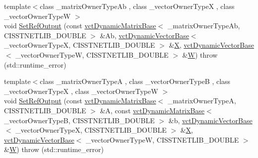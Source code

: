 \begin{DoxyCompactItemize}
\end{DoxyCompactItemize}

{\bf }\par
\begin{DoxyCompactItemize}
\item 
{\footnotesize template$<$class \+\_\+matrix\+Owner\+Type\+Ab , class \+\_\+vector\+Owner\+Type\+X , class \+\_\+vector\+Owner\+Type\+W $>$ }\\void \hyperlink{classnmr_n_n_l_s_dynamic_data_a8b4529a38e1b16bbe5f805e11a2f5560}{Set\+Ref\+Output} (const \hyperlink{classvct_dynamic_matrix_base}{vct\+Dynamic\+Matrix\+Base}$<$ \+\_\+matrix\+Owner\+Type\+Ab, C\+I\+S\+S\+T\+N\+E\+T\+L\+I\+B\+\_\+\+D\+O\+U\+B\+L\+E $>$ \&Ab, \hyperlink{classvct_dynamic_vector_base}{vct\+Dynamic\+Vector\+Base}$<$ \+\_\+vector\+Owner\+Type\+X, C\+I\+S\+S\+T\+N\+E\+T\+L\+I\+B\+\_\+\+D\+O\+U\+B\+L\+E $>$ \&\hyperlink{classnmr_n_n_l_s_dynamic_data_a2c67d4c5f9eff20ae015e60f85718f02}{X}, \hyperlink{classvct_dynamic_vector_base}{vct\+Dynamic\+Vector\+Base}$<$ \+\_\+vector\+Owner\+Type\+W, C\+I\+S\+S\+T\+N\+E\+T\+L\+I\+B\+\_\+\+D\+O\+U\+B\+L\+E $>$ \&\hyperlink{classnmr_n_n_l_s_dynamic_data_ae3204dc027313115b092088253dc4bb0}{W})  throw (std\+::runtime\+\_\+error)
\item 
{\footnotesize template$<$class \+\_\+matrix\+Owner\+Type\+A , class \+\_\+vector\+Owner\+Type\+B , class \+\_\+vector\+Owner\+Type\+X , class \+\_\+vector\+Owner\+Type\+W $>$ }\\void \hyperlink{classnmr_n_n_l_s_dynamic_data_aa959977e6c2fc5125cdbd0947f918630}{Set\+Ref\+Output} (const \hyperlink{classvct_dynamic_matrix_base}{vct\+Dynamic\+Matrix\+Base}$<$ \+\_\+matrix\+Owner\+Type\+A, C\+I\+S\+S\+T\+N\+E\+T\+L\+I\+B\+\_\+\+D\+O\+U\+B\+L\+E $>$ \&A, const \hyperlink{classvct_dynamic_matrix_base}{vct\+Dynamic\+Matrix\+Base}$<$ \+\_\+vector\+Owner\+Type\+B, C\+I\+S\+S\+T\+N\+E\+T\+L\+I\+B\+\_\+\+D\+O\+U\+B\+L\+E $>$ \&b, \hyperlink{classvct_dynamic_vector_base}{vct\+Dynamic\+Vector\+Base}$<$ \+\_\+vector\+Owner\+Type\+X, C\+I\+S\+S\+T\+N\+E\+T\+L\+I\+B\+\_\+\+D\+O\+U\+B\+L\+E $>$ \&\hyperlink{classnmr_n_n_l_s_dynamic_data_a2c67d4c5f9eff20ae015e60f85718f02}{X}, \hyperlink{classvct_dynamic_vector_base}{vct\+Dynamic\+Vector\+Base}$<$ \+\_\+vector\+Owner\+Type\+W, C\+I\+S\+S\+T\+N\+E\+T\+L\+I\+B\+\_\+\+D\+O\+U\+B\+L\+E $>$ \&\hyperlink{classnmr_n_n_l_s_dynamic_data_ae3204dc027313115b092088253dc4bb0}{W})  throw (std\+::runtime\+\_\+error)
\end{DoxyCompactItemize}

